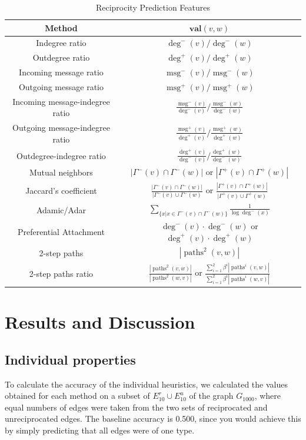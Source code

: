 \documentclass[conference]{IEEEtran}
\begin{document}
\begin{table}[!t]
\renewcommand{\arraystretch}{1.3}
\caption{Reciprocity Prediction Features}
\label{table_recmethods}
\centering
\begin{tabular}{|c||c|}
\hline
\bf{Method} & $\mathbf{val}(v,w)$\\
\hline
Indegree ratio & $\deg^-(v) / \deg^-(w)$ \\
Outdegree ratio & $\deg^+(v) / \deg^+(w)$ \\
\hline
Incoming message ratio & $\operatorname{msg}^-(v) / \operatorname{msg}^-(w)$ \\
Outgoing message ratio & $\operatorname{msg}^+(v) / \operatorname{msg}^+(w)$ \\
\hline
Incoming message-indegree ratio & $\frac{\operatorname{msg}^-(v)}{\deg^-(v)} / \frac{\operatorname{msg}^-(w)}{\deg^-(w)}$ \\
Outgoing message-indegree ratio & $\frac{\operatorname{msg}^+(v)}{\deg^+(v)} / \frac{\operatorname{msg}^+(w)}{\deg^+(w)}$ \\
\hline
Outdegree-indegree ratio & $\frac{\deg^+(v)}{\deg^-(v)} / \frac{\deg^+(w)}{\deg^-(w)} $ \\
\hline
Mutual neighbors & $|\Gamma^-(v) \cap \Gamma^-(w)|$ or $|\Gamma^+(v) \cap \Gamma^+(w)|$ \\
\hline
Jaccard's coefficient & $\frac{|\Gamma^-(v) \cap \Gamma^-(w)|}{|\Gamma^-(v) \cup \Gamma^-(w)}$ or $\frac{|\Gamma^+(v) \cap \Gamma^+(w)|}{|\Gamma^+(v) \cup \Gamma^+(w)}$ \\
\hline
Adamic/Adar & $\sum_{\{x|x \in \Gamma^-(v) \cap \Gamma^-(w)\}} \frac{1}{\log{\deg^-(x)}}$ \\
\hline
Preferential Attachment & $\deg^-(v)\cdot \deg^-(w)$ or  $\deg^+(v)\cdot \deg^+(w)$ \\
\hline
2-step paths & $ |\operatorname{paths}^2(v,w)|$ \\
\hline
2-step paths ratio & $\frac{|\operatorname{paths}^2(v,w)|}{|\operatorname{paths}^2(w,v)|}$ or $\frac{\sum_{i=1}^2 \beta^i|\operatorname{paths}^i(v,w)|}{\sum_{i=1}^2 \beta^i|\operatorname{paths}^i(w,v)|}$ \\
\hline
\end{tabular}
\end{table}

\section{Results and Discussion}

\subsection{Individual properties}
To calculate the accuracy of the individual heuristics, we calculated the values obtained for each method on a subset of $E_{10}^r \cup E_{10}^u$ of the graph $G_{1000}$, where equal numbers of edges were taken from the two sets of reciprocated and unreciprocated edges. The baseline accuracy is 0.500, since you would achieve this by simply predicting that all edges were of one type.
\end{document}
